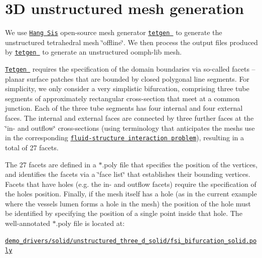  

\hypertarget{index_mesh}{}\section{3\+D unstructured mesh generation}\label{index_mesh}
We use \href{http://www.wias-berlin.de/~si }{\tt Hang Si\textquotesingle{}s} open-\/source mesh generator \href{http://wias-berlin.de/software/tetgen//}{\tt {\ttfamily tetgen} } to generate the unstructured tetrahedral mesh \char`\"{}offline\char`\"{}. We then process the output files produced by \href{http://wias-berlin.de/software/tetgen//}{\tt {\ttfamily tetgen} } to generate an unstructured {\ttfamily oomph-\/lib} mesh.

\href{http://wias-berlin.de/software/tetgen//}{\tt {\ttfamily Tetgen} } requires the specification of the domain boundaries via so-\/called facets -- planar surface patches that are bounded by closed polygonal line segments. For simplicity, we only consider a very simplistic bifurcation, comprising three tube segments of approximately rectangular cross-\/section that meet at a common junction. Each of the three tube segments has four internal and four external faces. The internal and external faces are connected by three further faces at the \char`\"{}in-\/ and outflow\char`\"{} cross-\/sections (using terminology that anticipates the mesh\textquotesingle{}s use in the corresponding \href{../../../interaction/unstructured_three_d_fsi/html/index.html}{\tt fluid-\/structure interaction problem}), resulting in a total of 27 facets.

The 27 facets are defined in a {\ttfamily $\ast$.poly} file that specifies the position of the vertices, and identifies the facets via a \char`\"{}face list\char`\"{} that establishes their bounding vertices. Facets that have holes (e.\+g. the in-\/ and outflow facets) require the specification of the hole\textquotesingle{}s position. Finally, if the mesh itself has a hole (as in the current example where the vessel\textquotesingle{}s lumen forms a hole in the mesh) the position of the hole must be identified by specifying the position of a single point inside that hole. The well-\/annotated {\ttfamily $\ast$.poly} file is located at\+:

\begin{center} \href{../../../../demo_drivers/solid/unstructured_three_d_solid/fsi_bifurcation_solid.poly}{\tt demo\+\_\+drivers/solid/unstructured\+\_\+three\+\_\+d\+\_\+solid/fsi\+\_\+bifurcation\+\_\+solid.\+poly} \end{center} 

